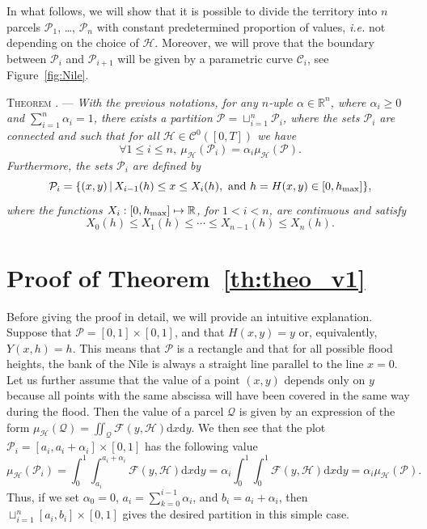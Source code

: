 \documentclass[A4paper, 12pt]{article}
\def\cC{{\mathcal{C}}}
\def\cH{\mathcal{H}}
\def\cP{\mathcal{P}}
\def\cQ{{\mathcal{Q}}}
\def\RR{{\mathbb{R}}}
\def\dd{{\mathrm{d}}}
\newcounter{thenum}
\def\texttheo{\relax}
\newenvironment{theorem}{\medbreak\refstepcounter{thenum}
\noindent\textsc{Theorem} %
\thethenum. \texttheo ---  \it  }{\rm }
\begin{document}
In what follows, we will show that 
it is possible to divide the territory into $n$ parcels $\cP_1$, \ldots,
$\cP_{n}$ with constant
predetermined proportion of values, \textit{i.e.} not depending on the
choice of $\cH$. Moreover, we will prove  that the boundary between  $\cP_{i}$ and  $\cP_{i+1}$  will be given by a parametric
curve $\mathcal{C}_{i}$, see Figure~\ref{fig:Nile}.


\begin{theorem}\label{th:theo_v1}
With the previous notations, for any $n$-uple $\alpha\in\RR^{n}$,
  where $\alpha_{i} \geq 0$ and $\sum_{i=1}^n \alpha_{i}=1$, there
  exists a partition $\cP=\sqcup_{i=1}^n \cP_i$, where
  the sets $\cP_{i}$ are connected and such that for all $\cH \in \cC^{0}([0,T])$ we have
$$\forall 1\le i\le n,\>
\mu_{\cH}(\cP_{i})=\alpha_{i} \mu_{\cH}(\cP).$$
Furthermore, the sets $\cP_i$ are defined by
\begin{equation}\label{eq:x_1}
\cP_i=\{ (x,y) \,|\, X_{i-1}(h)\le x\le X_{i}(h), \textrm{ and } h=H(x,y) \in[0,h_{\rm max}]\},
\end{equation}
where the functions %
$X_{i}:[0,h_{\rm max}]\mapsto\RR$, for $1<i<n$,
are continuous and satisfy
\begin{equation}\label{eq:x_2}
  X_{0}(h)\le X_{1}(h) \le\cdots\le X_{n-1}(h)\le X_{n}(h).
\end{equation}
\end{theorem}

\section{Proof of Theorem~\ref{th:theo_v1}}

Before giving the proof in detail, we will provide an intuitive explanation.
Suppose that $\cP=[0,1] \times [0,1]$, and that $H(x,y)=y$ or, equivalently, $Y(x,h)=h$. This means that $\cP$ is a rectangle and that for all possible flood heights, the bank of the Nile is always a straight line parallel to the line $x=0$.\\
Let us further assume that the value of a point $(x,y)$ depends only on $y$ because all points with the same abscissa will have been covered in the same way during the flood. Then the value of a parcel $\cQ$ is given by an expression of the form $\mu_{\cH}(\cQ)=\iint_{\cQ} \mathcal{F}(y,\mathcal{H}) \dd x \dd y$.
We then see that the plot $\cP_i=[a_i,a_i+\alpha_i]\times [0,1]$ has the following value
$$\mu_{\cH}(\cP_i)= \int_0^1 \int_{a_i}^{a_i+\alpha_i} \mathcal{F}(y,\mathcal{H}) \dd x \dd y= \alpha_i \int_0^1\int_0^1 \mathcal{F}(y,\mathcal{H}) \dd x \dd y=\alpha_i \mu_{\cH}(\cP).$$
Thus, if we set $\alpha_0=0$, $a_i=\sum_{k=0}^{i-1} \alpha_i$, and $b_i=a_i+\alpha_i$, then $\sqcup_{i=1}^n [a_i,b_i] \times [0,1]$ gives the desired partition in this simple case.\\
\end{document}
